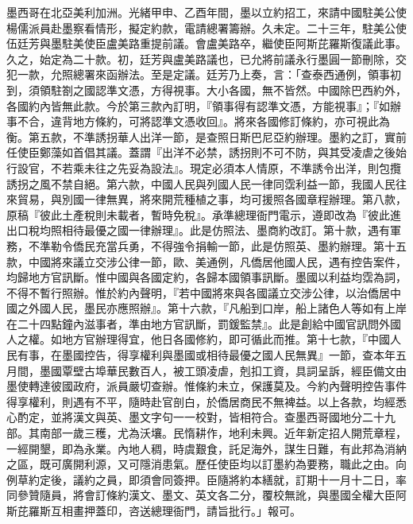 \begin{pinyinscope}
墨西哥在北亞美利加洲。光緒甲申、乙酉年間，墨以立約招工，來請中國駐美公使楊儒派員赴墨察看情形，擬定約款，電請總署籌辦。久未定。二十三年，駐美公使伍廷芳與墨駐美使臣盧美路重提前議。會盧美路卒，繼使臣阿斯芘羅斯復議此事。久之，始定為二十款。初，廷芳與盧美路議也，已允將前議永行墨圓一節刪除，交犯一款，允照總署來函辦法。至是定議。廷芳乃上奏，言：「查泰西通例，領事初到，須領駐劄之國認準文憑，方得視事。大小各國，無不皆然。中國除巴西約外，各國約內皆無此款。今於第三款內訂明，『領事得有認準文憑，方能視事』；『如辦事不合，違背地方條約，可將認準文憑收回』。將來各國修訂條約，亦可視此為衡。第五款，不準誘拐華人出洋一節，是查照日斯巴尼亞約辦理。墨約之訂，實前任使臣鄭藻如首倡其議。蓋謂『出洋不必禁，誘拐則不可不防，與其受凌虐之後始行設官，不若乘未往之先妥為設法』。現定必須本人情原，不準誘令出洋，則包攬誘拐之風不禁自絕。第六款，中國人民與列國人民一律同霑利益一節，我國人民往來貿易，與別國一律無異，將來開荒種植之事，均可援照各國章程辦理。第八款，原稿『彼此土產稅則未載者，暫時免稅』。承準總理衙門電示，遵即改為『彼此進出口稅均照相待最優之國一律辦理』。此是仿照法、墨商約改訂。第十款，遇有軍務，不準勒令僑民充當兵勇，不得強令捐輸一節，此是仿照英、墨約辦理。第十五款，中國將來議立交涉公律一節，歐、美通例，凡僑居他國人民，遇有控告案件，均歸地方官訊斷。惟中國與各國定約，各歸本國領事訊斷。墨國以利益均霑為詞，不得不暫行照辦。惟於約內聲明，『若中國將來與各國議立交涉公律，以治僑居中國之外國人民，墨民亦應照辦』。第十六款，『凡船到口岸，船上諸色人等如有上岸在二十四點鐘內滋事者，準由地方官訊斷，罰鍰監禁』。此是創給中國官訊問外國人之權。如地方官辦理得宜，他日各國修約，即可循此而推。第十七款，『中國人民有事，在墨國控告，得享權利與墨國或相待最優之國人民無異』一節，查本年五月間，墨國覃壁古埠華民數百人，被工頭凌虐，剋扣工資，具詞呈訴，經臣備文由墨使轉達彼國政府，派員嚴切查辦。惟條約未立，保護莫及。今約內聲明控告事件得享權利，則遇有不平，隨時赴官剖白，於僑居商民不無裨益。以上各款，均經悉心酌定，並將漢文與英、墨文字句一一校對，皆相符合。查墨西哥國地分二十九部。其南部一歲三穫，尤為沃壤。民惰耕作，地利未興。近年新定招人開荒章程，一經開墾，即為永業。內地人稠，時虞艱食，託足海外，謀生日難，有此邦為消納之區，既可廣開利源，又可隱消患氣。歷任使臣均以訂墨約為要務，職此之由。向例草約定後，議約之員，即須會同簽押。臣隨將約本繕就，訂期十一月十二日，率同參贊隨員，將會訂條約漢文、墨文、英文各二分，覆校無訛，與墨國全權大臣阿斯芘羅斯互相畫押蓋印，咨送總理衙門，請旨批行。」報可。


\end{pinyinscope}
